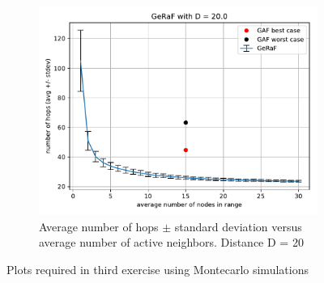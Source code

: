 \documentclass[11pt,a4paper]{article}
\begin{document}
\begin{figure}[ht]
\begin{subfigure}{.45\textwidth}
  \label{fig:hops10}
\end{subfigure}
\begin{subfigure}{.5\textwidth}
  \centering
  \includegraphics[width=\linewidth]{hops_montecarlo_D=20.pdf}
  \caption{Average number of hops $\pm$ standard deviation versus average number of active neighbors. Distance D = 20}
  \label{fig:hops20}
\end{subfigure}
\caption{Plots required in third exercise using Montecarlo simulations}
\end{figure}
\end{document}
